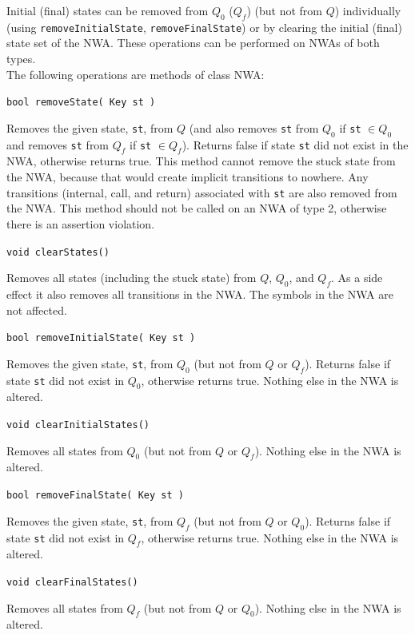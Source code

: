 \documentclass{llncs}
\begin{document}
Initial (final) states can be removed from $Q_0 $ ($Q_f$) (but not from $Q$) individually (using \texttt{removeInitialState}, \texttt{removeFinalState}) or by clearing the initial (final) state set of the NWA.  These operations can be performed on NWAs of both types. \\

\noindent The following operations are methods of class NWA:

\begin{description}

  \item\texttt{bool removeState( Key st )} \nopagebreak

    Removes the given state, \texttt{st}, from $Q$ (and also removes \texttt{st} from $Q_0$ if \texttt{st} $\in Q_0$ and removes \texttt{st} from $Q_f$ if \texttt{st} $\in Q_f$).  Returns false if state \texttt{st} did not exist in the NWA, otherwise returns true. This method cannot remove the stuck state from the NWA, because that would create implicit transitions to nowhere.  Any transitions (internal, call, and return) associated with \texttt{st} are also removed from the NWA.  This method should not be called on an NWA of type 2, otherwise there is an assertion violation.

  \item\texttt{void clearStates()} \nopagebreak

    Removes all states (including the stuck state) from $Q$, $Q_0$, and $Q_f$.  As a side effect it also removes all transitions in the NWA.  The symbols in the NWA are not affected.

  \item\texttt{bool removeInitialState( Key st )} \nopagebreak

    Removes the given state, \texttt{st}, from $Q_0$ (but not from $Q$ or $Q_f$).  Returns false if state \texttt{st} did not exist in $Q_0$, otherwise returns true.  Nothing else in the NWA is altered.  

  \item\texttt{void clearInitialStates()} \nopagebreak

    Removes all states from $Q_0$ (but not from $Q$ or $Q_f$).  Nothing else in the NWA is altered.

  \item\texttt{bool removeFinalState( Key st )} \nopagebreak

    Removes the given state, \texttt{st}, from $Q_f$ (but not from $Q$ or $Q_0$).  Returns false if state \texttt{st} did not exist in $Q_f$, otherwise returns true.  Nothing else in the NWA is altered.  

  \item\texttt{void clearFinalStates()} \nopagebreak

    Removes all states from $Q_f$ (but not from $Q$ or $Q_0$).  Nothing else in the NWA is altered. \\

\end{description}
\end{document}
